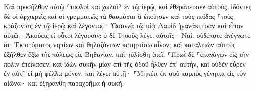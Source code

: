 \documentclass{openreader}
\begin{document}
Καὶ προσῆλθον αὐτῷ ⸂τυφλοὶ καὶ χωλοὶ⸃ ἐν τῷ ἱερῷ, καὶ ἐθεράπευσεν αὐτούς. 
ἰδόντες δὲ οἱ ἀρχιερεῖς καὶ οἱ γραμματεῖς τὰ θαυμάσια ἃ ἐποίησεν καὶ τοὺς παῖδας ⸀τοὺς κράζοντας ἐν τῷ ἱερῷ καὶ λέγοντας· Ὡσαννὰ τῷ υἱῷ Δαυίδ ἠγανάκτησαν 
καὶ εἶπαν αὐτῷ· Ἀκούεις τί οὗτοι λέγουσιν; ὁ δὲ Ἰησοῦς λέγει αὐτοῖς· Ναί. οὐδέποτε ἀνέγνωτε ὅτι Ἐκ στόματος νηπίων καὶ θηλαζόντων κατηρτίσω αἶνον; 
καὶ καταλιπὼν αὐτοὺς ἐξῆλθεν ἔξω τῆς πόλεως εἰς Βηθανίαν, καὶ ηὐλίσθη ἐκεῖ. 
⸀Πρωῒ δὲ ⸀ἐπανάγων εἰς τὴν πόλιν ἐπείνασεν. 
καὶ ἰδὼν συκῆν μίαν ἐπὶ τῆς ὁδοῦ ἦλθεν ἐπ’ αὐτήν, καὶ οὐδὲν εὗρεν ἐν αὐτῇ εἰ μὴ φύλλα μόνον, καὶ λέγει αὐτῇ· ⸀Μηκέτι ἐκ σοῦ καρπὸς γένηται εἰς τὸν αἰῶνα· καὶ ἐξηράνθη παραχρῆμα ἡ συκῆ. 
\end{document}
